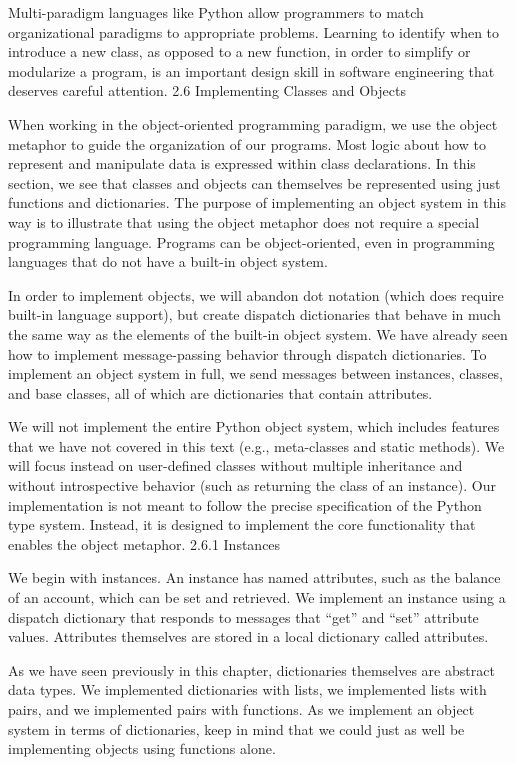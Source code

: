 \documentclass[letterpaper,10pt,dvipdfmx]{sphinxmanual}
\begin{document}
Multi-paradigm languages like Python allow programmers to match organizational paradigms to appropriate problems. Learning to identify when to introduce a new class, as opposed to a new function, in order to simplify or modularize a program, is an important design skill in software engineering that deserves careful attention.
2.6   Implementing Classes and Objects

When working in the object-oriented programming paradigm, we use the object metaphor to guide the organization of our programs. Most logic about how to represent and manipulate data is expressed within class declarations. In this section, we see that classes and objects can themselves be represented using just functions and dictionaries. The purpose of implementing an object system in this way is to illustrate that using the object metaphor does not require a special programming language. Programs can be object-oriented, even in programming languages that do not have a built-in object system.

In order to implement objects, we will abandon dot notation (which does require built-in language support), but create dispatch dictionaries that behave in much the same way as the elements of the built-in object system. We have already seen how to implement message-passing behavior through dispatch dictionaries. To implement an object system in full, we send messages between instances, classes, and base classes, all of which are dictionaries that contain attributes.

We will not implement the entire Python object system, which includes features that we have not covered in this text (e.g., meta-classes and static methods). We will focus instead on user-defined classes without multiple inheritance and without introspective behavior (such as returning the class of an instance). Our implementation is not meant to follow the precise specification of the Python type system. Instead, it is designed to implement the core functionality that enables the object metaphor.
2.6.1   Instances

We begin with instances. An instance has named attributes, such as the balance of an account, which can be set and retrieved. We implement an instance using a dispatch dictionary that responds to messages that ``get'' and ``set'' attribute values. Attributes themselves are stored in a local dictionary called attributes.

As we have seen previously in this chapter, dictionaries themselves are abstract data types. We implemented dictionaries with lists, we implemented lists with pairs, and we implemented pairs with functions. As we implement an object system in terms of dictionaries, keep in mind that we could just as well be implementing objects using functions alone.
\end{document}
